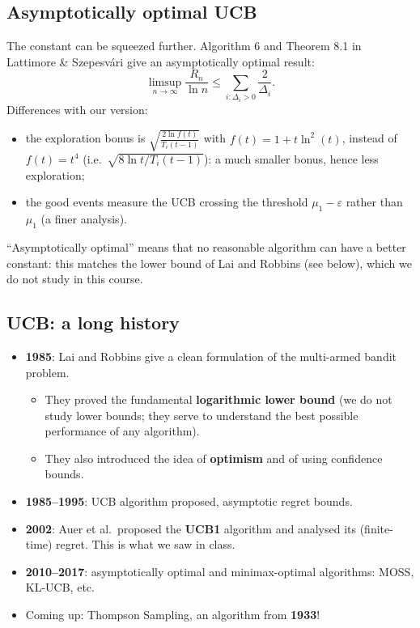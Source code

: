 \subsection{Asymptotically optimal UCB}

The constant can be squeezed further. Algorithm 6 and Theorem 8.1 in Lattimore \& Szepesvári give an asymptotically optimal result:
\[
\limsup_{n\to\infty} \frac{R_n}{\ln n} \leq \sum_{i:\Delta_i > 0} \frac{2}{\Delta_i}.
\]
Differences with our version:
\begin{itemize}
    \item the exploration bonus is $\sqrt{\frac{2\ln f(t)}{T_i(t-1)}}$ with $f(t) = 1 + t\ln^2(t)$, instead of $f(t) = t^4$ (i.e.\ $\sqrt{8\ln t/T_i(t-1)}$): a much smaller bonus, hence less exploration;
    \item the good events measure the UCB crossing the threshold $\mu_1 - \varepsilon$ rather than $\mu_1$ (a finer analysis).
\end{itemize}
``Asymptotically optimal'' means that no reasonable algorithm can have a better constant: this matches the lower bound of Lai and Robbins (see below), which we do not study in this course.

\subsection{UCB: a long history}

\begin{itemize}
    \item \textbf{1985}: Lai and Robbins give a clean formulation of the multi-armed bandit problem.
    \begin{itemize}
        \item They proved the fundamental \textbf{logarithmic lower bound} (we do not study lower bounds; they serve to understand the best possible performance of any algorithm).
        \item They also introduced the idea of \textbf{optimism} and of using confidence bounds.
    \end{itemize}
    \item \textbf{1985--1995}: UCB algorithm proposed, asymptotic regret bounds.
    \item \textbf{2002}: Auer et al.\ proposed the \textbf{UCB1} algorithm and analysed its (finite-time) regret. This is what we saw in class.
    \item \textbf{2010--2017}: asymptotically optimal and minimax-optimal algorithms: MOSS, KL-UCB, etc.
    \item Coming up: Thompson Sampling, an algorithm from \textbf{1933}!
\end{itemize}

